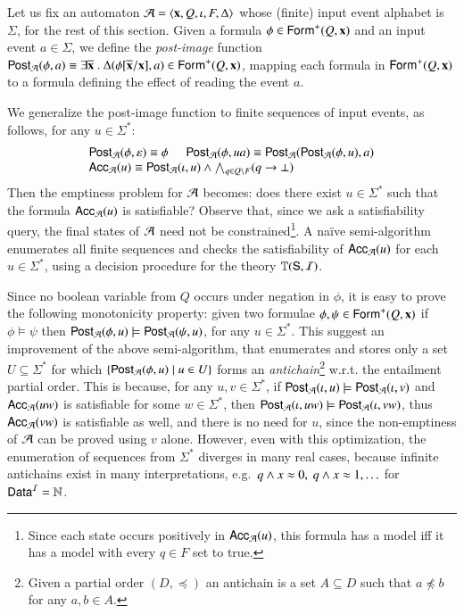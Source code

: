 \documentclass[10pt,conference,letterpaper,twocolumn]{IEEEtran}
\begin{document}
Let us fix an automaton $\mathcal{A} = \left\langle \mathbf x,Q,\iota,F,\Delta \right\rangle$ whose
(finite) input event alphabet is $\Sigma$, for the rest of this
section. Given a formula $\phi \in \mathsf{Form}^+(Q,\mathbf x)$ and an input
event $a \in \Sigma$, we define the \emph{post-image} function
$\mathsf{Post}_{\mathcal{A}}(\phi,a) \equiv \exists \overline{\mathbf x} ~.~
\Delta(\phi[\overline{\mathbf x}/\mathbf x], a) \in \mathsf{Form}^+(Q,\mathbf x)$,
mapping each formula in $\mathsf{Form}^+(Q,\mathbf x)$ to a formula defining the
effect of reading the event $a$.

We generalize the post-image function to finite sequences of input
events, as follows, for any $u \in \Sigma^*$:
\[\begin{array}{l}
\mathsf{Post}_{\mathcal{A}}(\phi,\varepsilon) \equiv \phi \hspace*{5mm} \mathsf{Post}_{\mathcal{A}}(\phi,ua) \equiv \mathsf{Post}_{\mathcal{A}}(\mathsf{Post}_{\mathcal{A}}(\phi,u),a) \\
\mathsf{Acc}_{\mathcal{A}}(u) \equiv \mathsf{Post}_{\mathcal{A}}(\iota,u) \wedge \bigwedge_{q \in Q \setminus F} (q \rightarrow \bot)
\end{array}\]
Then the emptiness problem for $\mathcal{A}$ becomes: does there exist $u \in
\Sigma^*$ such that the formula $\mathsf{Acc}_{\mathcal{A}}(u)$ is satisfiable?
Observe that, since we ask a satisfiability query, the final states of
$\mathcal{A}$ need not be constrained\footnote{ Since each state occurs
  positively in $\mathsf{Acc}_{\mathcal{A}}(u)$, this formula has a model iff it has
  a model with every $q \in F$ set to true.}. A na\"ive semi-algorithm
enumerates all finite sequences and checks the satisfiability of
$\mathsf{Acc}_{\mathcal{A}}(u)$ for each $u \in \Sigma^*$, using a decision procedure
for the theory $\mathbb{T}(\mathsf{S},\mathcal{I})$.

Since no boolean variable from $Q$ occurs under negation in $\phi$, it
is easy to prove the following monotonicity property: given two
formulae $\phi,\psi \in \mathsf{Form}^+(Q,\mathbf x)$ if $\phi \models \psi$
then $\mathsf{Post}_{\mathcal{A}}(\phi,u) \models \mathsf{Post}_{\mathcal{A}}(\psi,u)$, for any $u \in
\Sigma^*$. This suggest an improvement of the above semi-algorithm,
that enumerates and stores only a set $U \subseteq \Sigma^*$ for which
$\left\{ \mathsf{Post}_{\mathcal{A}}(\phi,u) \mid u \in U \right\}$ forms an
\emph{antichain}\footnote{Given a partial order $(D,\preceq)$ an
  antichain is a set $A \subseteq D$ such that $a \not\preceq b$ for
  any $a,b \in A$.} w.r.t. the entailment partial order. This is
because, for any $u,v \in \Sigma^*$, if $\mathsf{Post}_{\mathcal{A}}(\iota,u) \models
\mathsf{Post}_{\mathcal{A}}(\iota,v)$ and $\mathsf{Acc}_{\mathcal{A}}(uw)$ is satisfiable for some $w
\in \Sigma^*$, then $\mathsf{Post}_{\mathcal{A}}(\iota,uw) \models \mathsf{Post}_{\mathcal{A}}(\iota,vw)$,
thus $\mathsf{Acc}_{\mathcal{A}}(vw)$ is satisfiable as well, and there is no need
for $u$, since the non-emptiness of $\mathcal{A}$ can be proved using $v$
alone. However, even with this optimization, the enumeration of
sequences from $\Sigma^*$ diverges in many real cases, because
infinite antichains exist in many interpretations, e.g.\ $q \wedge x
\approx 0,~ q \wedge x \approx 1, \ldots$ for $\mathsf{Data}^{\mathcal{I}} = {\bf \mathbb{N}}$.
\end{document}
